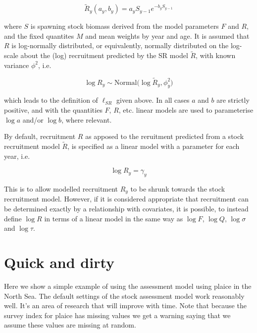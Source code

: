 \documentclass[a4paper,english,10pt]{article}\usepackage[]{graphicx}\usepackage[]{color}
\begin{document}
\begin{equation*}
  \tilde{R}_y(a_y,b_y) = a_y S_{y-1} e^{-b_y S_{y-1}}
\end{equation*}

where $S$ is spawning stock biomass derived from the model parameters $F$ and $R$, and the fixed quantites $M$ and mean weights by year and age. It is assumed that $R$ is log-normally distributed, or equivalently, normally distributed on the log-scale about the (log) recruitment predicted by the SR model $\tilde{R}$, with known variance $\phi^2$, i.e.

\begin{equation*}
  \log R_y \sim \text{Normal} \Big( \log \tilde{R}_y, \phi_y^2 \Big)
\end{equation*}

which leads to the definition of $\ell_{SR}$ given above. In all cases $a$ and $b$ are strictly positive, and with the quantities $F$, $R$, etc. linear models are used to parameterise $\log a$ and/or $\log b$, where relevant.

By default, recruitment $R$ as apposed to the reruitment predicted from a stock recruitment model $\tilde{R}$, is specified as a linear model with a parameter for each year, i.e.

\begin{equation*}
  \log R_y = \gamma_y
\end{equation*}

This is to allow modelled recruitment $R_y$ to be shrunk towards the stock recruitment model.  However, if it is considered appropriate that recruitment can be determined exactly by a relationship with covariates, it is possible, to instead define $\log R$ in terms of a linear model in the same way as $\log F$, $\log Q$, $\log \sigma$ and $\log \tau$.  %


\section{Quick and dirty}

Here we show a simple example of using the assessment model using plaice in the North Sea. The default settings of the stock assessment model work reasonably well. It's an area of research that will improve with time. Note that because the survey index for plaice has missing values we get a warning saying that we assume these values are missing at random.
\end{document}
